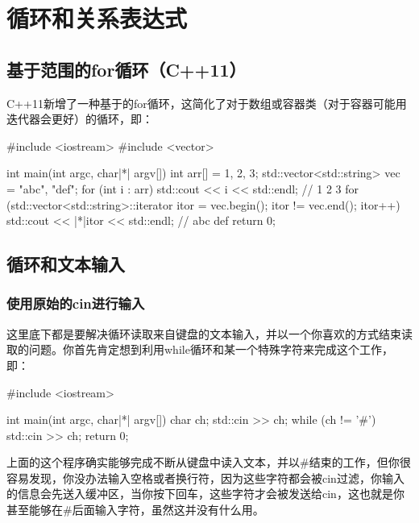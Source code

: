 
\chapter{循环和关系表达式}

\addtocounter{section}{3}

\section{基于范围的for循环（C++11）}

C++11新增了一种基于的for循环，这简化了对于数组或容器类（对于容器可能用迭代器会更好）的循环，即：

\begin{cpp}
#include <iostream>
#include <vector>

int main(int argc, char|*| argv[]) {
    int arr[] = {1, 2, 3};
    std::vector<std::string> vec = {"abc", "def"};
    for (int i : arr) {
        std::cout << i << std::endl; // 1 2 3
    }
    for (std::vector<std::string>::iterator itor = vec.begin();
            itor != vec.end(); itor++) {
        std::cout << |*|itor << std::endl; // abc def
    }
    return 0;
}
\end{cpp}

\section{循环和文本输入}

\subsection{使用原始的cin进行输入}

这里底下都是要解决循环读取来自键盘的文本输入，并以一个你喜欢的方式结束读取的问题。你首先肯定想到利用while循环和某一个特殊字符来完成这个工作，即：

\begin{cpp}
#include <iostream>

int main(int argc, char|*| argv[]) {
    char ch;
    std::cin >> ch;
    while (ch != '#') {
        std::cin >> ch;
    }
    return 0;
}
\end{cpp}

上面的这个程序确实能够完成不断从键盘中读入文本，并以\#结束的工作，但你很容易发现，你没办法输入空格或者换行符，因为这些字符都会被cin过滤，你输入的信息会先送入缓冲区，当你按下回车，这些字符才会被发送给cin，这也就是你甚至能够在\#后面输入字符，虽然这并没有什么用。

